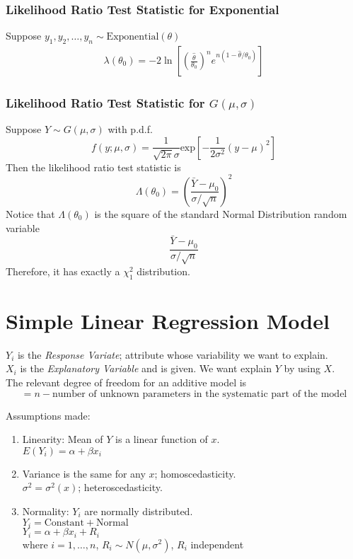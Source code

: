\documentclass[12pt, leqno]{article}
\theoremstyle{definition}
\begin{document}
  \subsubsection{Likelihood Ratio Test Statistic for Exponential}
  Suppose $y_1, y_2, \dots, y_n \sim \text{Exponential}(\theta)$
  \begin{align*}
    \lambda(\theta_0) = -2
    \ln{
    \left[
      \left(\frac{\hat{\theta}}{\theta_0}\right)^{n}
      e^{n(1 - \hat{\theta}/\theta_0)}
    \right]
    }
  \end{align*}

  \subsubsection{Likelihood Ratio Test Statistic for $G(\mu, \sigma)$}
  Suppose $Y \sim G(\mu, \sigma)$ with p.d.f.
  $$
  f(y; \mu, \sigma) =
  \frac{1}{\sqrt{2\pi}\sigma}
  \text{exp}\left[-\frac{1}{2\sigma^{2}}(y - \mu)^{2}\right]
  $$
  Then the likelihood ratio test statistic is
  $$
  \Lambda(\theta_0) =
  \left(\frac{\bar{Y} - \mu_0}{\sigma/\sqrt{n}}
  \right)^{2}
  $$
  Notice that $\Lambda(\theta_0)$ is the square of the standard Normal Distribution random variable
  $$\frac{\bar{Y} - \mu_0}{\sigma/\sqrt{n}}$$
  Therefore, it has exactly a $\chi_{1}^{2}$ distribution.

  \section{Simple Linear Regression Model}
  $Y_{i}$ is the \emph{Response Variate}; attribute whose variability we want to explain. \\
  $X_{i}$ is the \emph{Explanatory Variable} and is given.
  We want explain $Y$ by using $X$. \\

  The relevant degree of freedom for an additive model is
  $$= n - \text{number of unknown parameters in the systematic part of the model}$$

  Assumptions made:
  \begin{enumerate}
    \item Linearity: Mean of $Y$ is a linear function of $x$.\\
    $E(Y_{i}) = \alpha + \beta x_{i}$
    \item Variance is the same for any $x$; homoscedasticity. \\
    $\sigma^{2} = \sigma^{2}(x)$; heteroscedasticity.
    \item Normality: $Y_{i}$ are normally distributed. \\
    $Y_{i} = \text{Constant} + \text{Normal}$ \\
    $Y_{i} = \alpha + \beta x_{i} + R_{i}$ \\
    where $i = 1, \dots, n$, $R_{i} \sim N(\mu, \sigma^{2})$, $R_{i}$ independent
  \end{enumerate}
\end{document}
